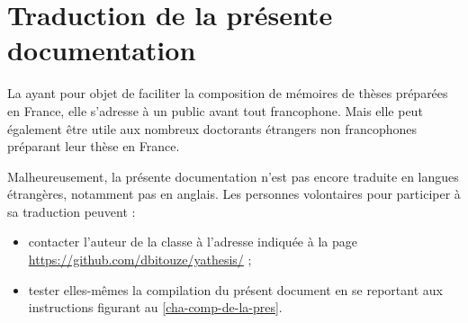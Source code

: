 \chapter{Traduction de la présente documentation}\label{cha-trad-de-la-pres}

%
%

La \yatCl{} ayant pour objet de faciliter la composition de mémoires de thèses
préparées en France, elle s'adresse à un public avant tout francophone. Mais
elle peut également être utile aux nombreux doctorants étrangers non
francophones préparant leur thèse en France.

Malheureusement, la présente documentation n'est pas encore traduite en langues
étrangères, notamment pas en anglais. Les personnes volontaires pour participer
à sa traduction peuvent :
\begin{itemize}
\item contacter l'auteur de la classe à l'adresse indiquée à la page
  \url{https://github.com/dbitouze/yathesis/} ;
\item tester elles-mêmes la compilation du présent document en se reportant aux
  instructions figurant au \vref{cha-comp-de-la-pres}.
\end{itemize}


